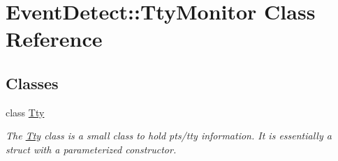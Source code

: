\hypertarget{classEventDetect_1_1TtyMonitor}{}\section{Event\+Detect\+:\+:Tty\+Monitor Class Reference}
\label{classEventDetect_1_1TtyMonitor}
\subsection*{Classes}
\begin{DoxyCompactItemize}
\item 
class \mbox{\hyperlink{classEventDetect_1_1TtyMonitor_1_1Tty}{Tty}}
\begin{DoxyCompactList}\small\item\em The \mbox{\hyperlink{classEventDetect_1_1TtyMonitor_1_1Tty}{Tty}} class is a small class to hold pts/tty information. It is essentially a struct with a parameterized constructor. \end{DoxyCompactList}\end{DoxyCompactItemize}
